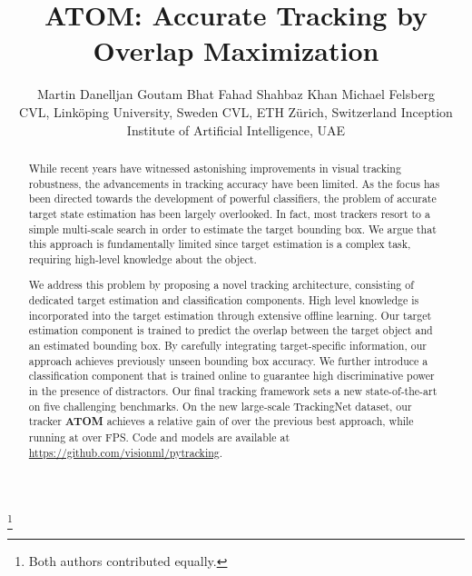 \documentclass[10pt,twocolumn,letterpaper]{article}
\begin{document}
\title{ATOM: Accurate Tracking by Overlap Maximization}

\newcommand{\asep}{\hspace{6mm}}
\newcommand{\aand}{\hspace{6mm}}
\author{Martin Danelljan \aand Goutam Bhat \aand Fahad Shahbaz Khan \aand Michael Felsberg \vspace{1.5mm}\\
	 \small  CVL, Link\"oping University, Sweden \asep  CVL, ETH Z\"urich, Switzerland \asep  Inception Institute of Artificial Intelligence, UAE
}

\maketitle
\thispagestyle{empty}

\begin{abstract}
   While recent years have witnessed astonishing improvements in visual tracking robustness, the advancements in tracking accuracy have been limited. As the focus has been directed towards the development of powerful classifiers, the problem of accurate target state estimation has been largely overlooked. In fact, most trackers resort to a simple multi-scale search in order to estimate the target bounding box. We argue that this approach is fundamentally limited since target estimation is a complex task, requiring high-level knowledge about the object.  

We address this problem by proposing a novel tracking architecture, consisting of dedicated target estimation and classification components. High level knowledge is incorporated into the target estimation through extensive offline learning. Our target estimation component is trained to predict the overlap between the target object and an estimated bounding box. By carefully integrating target-specific information, our approach achieves previously unseen bounding box accuracy. We further introduce a classification component that is trained online to guarantee high discriminative power in the presence of distractors. Our final tracking framework sets a new state-of-the-art on five challenging benchmarks. On the new large-scale TrackingNet dataset, our tracker \textbf{ATOM} achieves a relative gain of  over the previous best approach, while running at over  FPS. Code and models are available at \url{https://github.com/visionml/pytracking}. \end{abstract}

{\let\thefootnote\relax\footnote{{Both authors contributed equally.}}}
\end{document}
